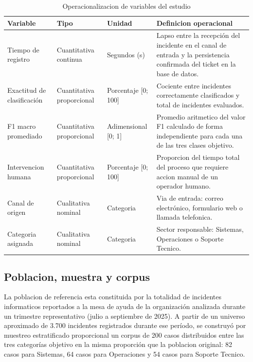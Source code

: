 \begin{table}[htbp]
\centering
\caption{Operacionalizacion de variables del estudio}
\label{tab:variables}
\small
\begin{tabular}{@{}p{2.5cm} >{\raggedright\arraybackslash}p{3.2cm} >{\raggedright\arraybackslash}p{2.3cm} >{\raggedright\arraybackslash}p{5.4cm}@{}}
\toprule
\textbf{Variable} & \textbf{Tipo} & \textbf{Unidad} & \textbf{Definicion operacional} \\
\midrule
Tiempo de registro & Cuantitativa continua & Segundos (s) & Lapso entre la recepción del incidente en el canal de entrada y la persistencia confirmada del ticket en la base de datos. \\
Exactitud de clasificación & Cuantitativa proporcional & Porcentaje [0; 100] & Cociente entre incidentes correctamente clasificados y total de incidentes evaluados. \\
F1 macro promediado & Cuantitativa proporcional & Adimensional [0; 1] & Promedio aritmetico del valor F1 calculado de forma independiente para cada una de las tres clases objetivo. \\
Intervencion humana & Cuantitativa proporcional & Porcentaje [0; 100] & Proporcion del tiempo total del proceso que requiere accion manual de un operador humano. \\
Canal de origen & Cualitativa nominal & Categoria & Via de entrada: correo electrónico, formulario web o llamada telefonica. \\
Categoria asignada & Cualitativa nominal & Categoria & Sector responsable: Sistemas, Operaciones o Soporte Tecnico. \\
\bottomrule
\end{tabular}
\end{table}

\subsection{Poblacion, muestra y corpus}

La poblacion de referencia esta constituida por la totalidad de incidentes informaticos reportados a la mesa de ayuda de la organización analizada durante un trimestre representativo (julio a septiembre de 2025). A partir de un universo aproximado de 3.700 incidentes registrados durante ese período, se construyó por muestreo estratificado proporcional un corpus de 200 casos distribuidos entre las tres categorías objetivo en la misma proporción que la poblacion original: 82 casos para Sistemas, 64 casos para Operaciones y 54 casos para Soporte Tecnico.

